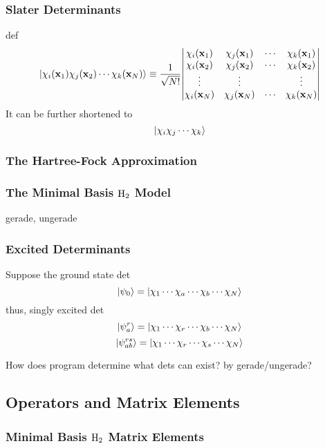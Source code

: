 \documentclass[a4paper]{article}
\numberwithin{equation}{section}
\begin{document}
\subsubsection{Slater Determinants}
def
\begin{equation}\label{key}
\ket{\chi_i(\vb{x}_1)\chi_j(\vb{x}_2)\cdots\chi_k(\vb{x}_N)} 
\equiv \dfrac{1}{\sqrt{N!}}
\mqty| \chi_i(\vb{x}_1) & \chi_j(\vb{x}_1) & \cdots & \chi_k(\vb{x}_1)\\
        \chi_i(\vb{x}_2) & \chi_j(\vb{x}_2) & \cdots & \chi_k(\vb{x}_2)\\
        \vdots & \vdots & & \vdots \\
        \chi_i(\vb{x}_N) & \chi_j(\vb{x}_N) & \cdots & \chi_k(\vb{x}_N)|
\end{equation}
It can be further shortened to
\begin{equation}\label{key}
\ket{\chi_i\chi_j\cdots\chi_k}
\end{equation}
\subsubsection{The Hartree-Fock Approximation}
\subsubsection{The Minimal Basis $ \ce{H_2} $ Model}
gerade, ungerade
\subsubsection{Excited Determinants}
Suppose the ground state det
\begin{equation}\label{key}
\ket{\psi_0} = \ket{\chi_1\cdots\chi_a\cdots\chi_b\cdots\chi_N}
\end{equation}
thus, singly excited det
\begin{equation}\label{key}
\ket{\psi_a^r} = \ket{\chi_1\cdots\chi_r\cdots\chi_b\cdots\chi_N}
\end{equation}
\begin{equation}\label{key}
\ket{\psi_{ab}^{rs}} = \ket{\chi_1\cdots\chi_r\cdots\chi_s\cdots\chi_N}
\end{equation}

How does program determine what dets can exist? by gerade/ungerade?

\subsection{Operators and Matrix Elements}
\subsubsection{Minimal Basis $ \ce{H_2} $ Matrix Elements}
\end{document}
